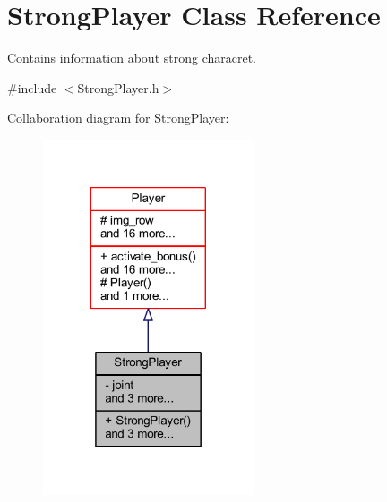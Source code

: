 \hypertarget{class_strong_player}{}\section{Strong\+Player Class Reference}
\label{class_strong_player}


Contains information about strong characret.  




{\ttfamily \#include $<$Strong\+Player.\+h$>$}



Collaboration diagram for Strong\+Player\+:
\nopagebreak
\begin{figure}[H]
\begin{center}
\leavevmode
\includegraphics[width=176pt]{class_strong_player__coll__graph}
\end{center}
\end{figure}
